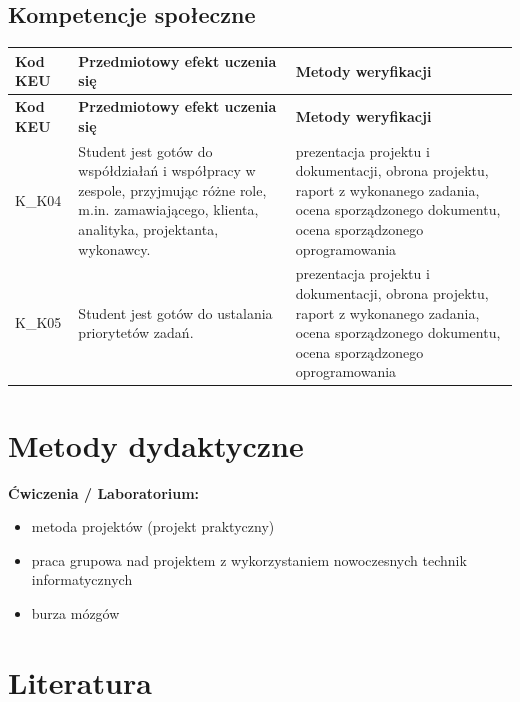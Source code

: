 \documentclass[12pt, a4paper]{article}
\newcommand{\thdrule}{\noalign{\global\setlength{\extrarowheight}{0pt}}}
\newcommand{\thdend}{\noalign{\global\setlength{\extrarowheight}{3pt}}}
\begin{document}
\subsection*{Kompetencje społeczne}
{\scriptsize
\begin{longtable}{m{1.6cm}m{9.0cm}m{4.2cm}}
\thdrule\toprule
\rowcolor{pjatkRed} {\color{white}\footnotesize\textbf{\vphantom{Ag}Kod KEU}} & {\color{white}\footnotesize\textbf{\vphantom{Ag}Przedmiotowy efekt uczenia się}} & {\color{white}\footnotesize\textbf{\vphantom{Ag}Metody weryfikacji}} \\
\midrule\thdend
\endfirsthead
\thdrule\toprule
\rowcolor{pjatkRed} {\color{white}\footnotesize\textbf{\vphantom{Ag}Kod KEU}} & {\color{white}\footnotesize\textbf{\vphantom{Ag}Przedmiotowy efekt uczenia się}} & {\color{white}\footnotesize\textbf{\vphantom{Ag}Metody weryfikacji}} \\
\midrule\thdend
\endhead
  \rowcolor{tableRowLight} K\_K04 & Student jest gotów do współdziałań i współpracy w zespole, przyjmując różne role, m.in. zamawiającego, klienta, analityka, projektanta, wykonawcy. & prezentacja projektu i dokumentacji, obrona projektu, raport z wykonanego zadania, ocena sporządzonego dokumentu, ocena sporządzonego oprogramowania \\
  \rowcolor{tableRowAlt} K\_K05 & Student jest gotów do ustalania priorytetów zadań. & prezentacja projektu i dokumentacji, obrona projektu, raport z wykonanego zadania, ocena sporządzonego dokumentu, ocena sporządzonego oprogramowania \\
\bottomrule
\end{longtable}}

\section{Metody dydaktyczne}

\textbf{Ćwiczenia / Laboratorium:}
\begin{itemize}
  \item metoda projektów (projekt praktyczny)
  \item praca grupowa nad projektem z wykorzystaniem nowoczesnych technik informatycznych
  \item burza mózgów
\end{itemize}
\vspace{4pt}


\section{Literatura}
\end{document}
